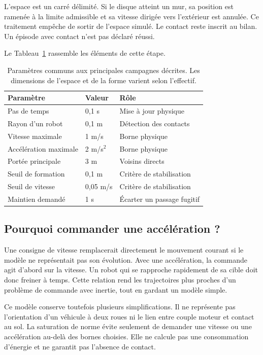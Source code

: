 L'espace est un carré délimité. Si le disque atteint un mur, sa position est ramenée à la limite admissible et sa vitesse dirigée vers l'extérieur est annulée. Ce traitement empêche de sortir de l'espace simulé. Le contact reste inscrit au bilan. Un épisode avec contact n'est pas déclaré réussi.

Le Tableau~\ref{tab:methode-1} rassemble les éléments de cette étape.
\begin{table}[htbp]
\caption{Paramètres communs aux principales campagnes décrites. Les dimensions de l'espace et de la forme varient selon l'effectif.}
\label{tab:methode-1}
\centering
\begin{tabular}{lll}\toprule
Paramètre & Valeur & Rôle\\\midrule
Pas de temps & 0,1 s & Mise à jour physique\\
Rayon d'un robot & 0,1 m & Détection des contacts\\
Vitesse maximale & 1 m/s & Borne physique\\
Accélération maximale & 2 m/s$^2$ & Borne physique\\
Portée principale & 3 m & Voisins directs\\
Seuil de formation & 0,1 m & Critère de stabilisation\\
Seuil de vitesse & 0,05 m/s & Critère de stabilisation\\
Maintien demandé & 1 s & Écarter un passage fugitif\\\bottomrule
\end{tabular}

\end{table}


\subsection{Pourquoi commander une accélération ?}
Une consigne de vitesse remplacerait directement le mouvement courant si le modèle ne représentait pas son évolution. Avec une accélération, la commande agit d'abord sur la vitesse. Un robot qui se rapproche rapidement de sa cible doit donc freiner à temps. Cette relation rend les trajectoires plus proches d'un problème de commande avec inertie, tout en gardant un modèle simple.

Ce modèle conserve toutefois plusieurs simplifications. Il ne représente pas l'orientation d'un véhicule à deux roues ni le lien entre couple moteur et contact au sol. La saturation de norme évite seulement de demander une vitesse ou une accélération au-delà des bornes choisies. Elle ne calcule pas une consommation d'énergie et ne garantit pas l'absence de contact.

